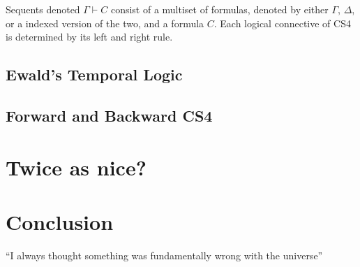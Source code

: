 \documentclass{article}
\begin{document}
Sequents denoted $\Gamma \vdash C$ consist of a multiset of formulas,
denoted by either $\Gamma$, $\Delta$, or a indexed version of the two,
and a formula $C$.  Each logical connective of CS4 is determined by
its left and right rule.

\subsection{Ewald's Temporal Logic}
\subsection{Forward and Backward CS4}
\section{Twice as nice?}


\section{Conclusion}
``I always thought something was fundamentally wrong with the universe'' 



\end{document}

